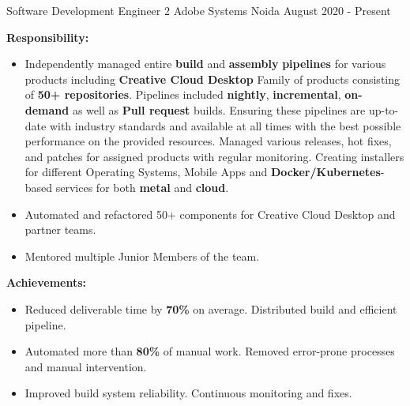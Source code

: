 

\begin{cventries}
\vspace{-1mm}

\cventry
    {Software Development Engineer 2} %
    {Adobe Systems} %
    {Noida} %
    {August 2020 - Present} %
    {
        \vspace{-4mm}
        \item \textbf{Responsibility:} 
        \begin{itemize}
            \item Independently managed entire \textbf{build} and \textbf{assembly} \textbf{pipelines} for various products including \textbf{Creative Cloud Desktop} Family of products consisting of \textbf{50+ repositories}. Pipelines included \textbf{nightly}, \textbf{incremental}, \textbf{on-demand} as well as \textbf{Pull request} builds. Ensuring these pipelines are up-to-date with industry standards and available at all times with the best possible performance on the provided resources. Managed various releases, hot fixes, and patches for assigned products with regular monitoring. Creating installers for different Operating Systems, Mobile Apps and \textbf{Docker/Kubernetes}-based services for both \textbf{metal} and \textbf{cloud}.
            \item Automated and refactored 50+ components for Creative Cloud Desktop and partner teams.
            \item Mentored multiple Junior Members of the team.
        \end{itemize}
        \item \textbf{Achievements:}
        \begin{itemize}
            \item Reduced deliverable time by \textbf{70\%} on average. Distributed build and efficient pipeline.
            \item Automated more than \textbf{80\%} of manual work. Removed error-prone processes and manual intervention.
            \item Improved build system reliability. Continuous monitoring and fixes.

\end{itemize}}
\end{cventries}
